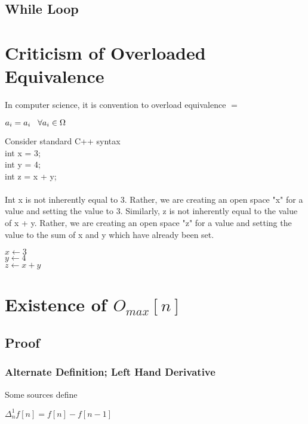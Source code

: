 \documentclass[11pt]{article}
\begin{document}
\subsection{While Loop}



\section{Criticism of Overloaded Equivalence}
In computer science, it is convention to overload equivalence $=$
\begin{center}
$
a_i = a_i \hspace{3mm} \forall a_i \in \Omega
$
\end{center}
\vspace{3mm}
Consider standard C++ syntax\\
int x = 3;\\
int y = 4;\\
int z = x + y;\\ \\
Int x is not inherently equal to 3. Rather, we are creating an open space "x" for a value and setting the value to 3. Similarly, z is not inherently equal
to the value of x + y. Rather, we are creating an open space "z" for a value and setting the value to the sum of x and y which have already been set.
\begin{center}
$
x \leftarrow 3
$
\\ \vspace{2mm}
$
y \leftarrow 4
$
\\ \vspace{2mm}
$
z \leftarrow x + y
$
\end{center}

\section{Existence of $O_{max}[n]$}
\subsection{Proof}


\subsubsection{Alternate Definition; Left Hand Derivative}
Some sources define
\begin{center}
$
\Delta_n^1 f[n] = f[n] - f[n-1]
$
\end{center}
\end{document}
